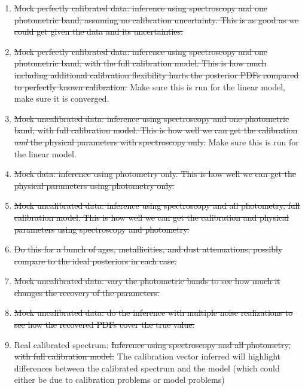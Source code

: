\documentclass[iop,numberedappendix]{emulateapj}
\begin{document}
\begin{enumerate}

\item \sout{Mock perfectly calibrated data: inference using spectroscopy and one
  photometric band, assuming no calibration uncertainty.  This is as
  good as we could get given the data and its uncertainties.}

\item \sout{Mock perfectly calibrated data: inference using
spectroscopy and one photometric band, with the full calibration
model.  This is how much including additional calibration flexibility
hurts the posterior PDFs compared to perfectly known calibration.}
Make sure this is run for the linear model, make sure it is converged.

\item \sout{Mock uncalibrated data:  inference using spectroscopy and one
  photometric band, with full calibration model.  This is how well we
  can get the calibration \emph{and} the physical parameters with
  spectroscopy only.}
Make sure this is run for the linear model.

\item \sout{Mock data: inference using photometry only.  This is how well we
  can get the physical parameters using photometry only.}

\item \sout{Mock uncalibrated data: inference using spectroscopy and all
  photometry, full calibration model.  This is how well we
  can get the calibration and physical parameters using spectroscopy
  and photometry.}

\item \sout{Do this for a bunch of ages, metallicities, and dust
  attenuations, possibly compare to the ideal posteriors in each case.}

\item \sout{Mock uncalibrated data:  vary the photometric bands to see how
  much it changes the recovery of the parameters.}

\item \sout{Mock uncalibrated data: do the inference with multiple noise
  realizations to see how the recovered PDFs cover the true value.}

\item Real calibrated spectrum:   \sout{Inference using spectroscopy and all
  photometry, with full calibration model.} The calibration vector
  inferred will highlight differences between the calibrated spectrum
  and the model (which could either be due to calibration problems or
  model problems)


\end{enumerate}
\end{document}
